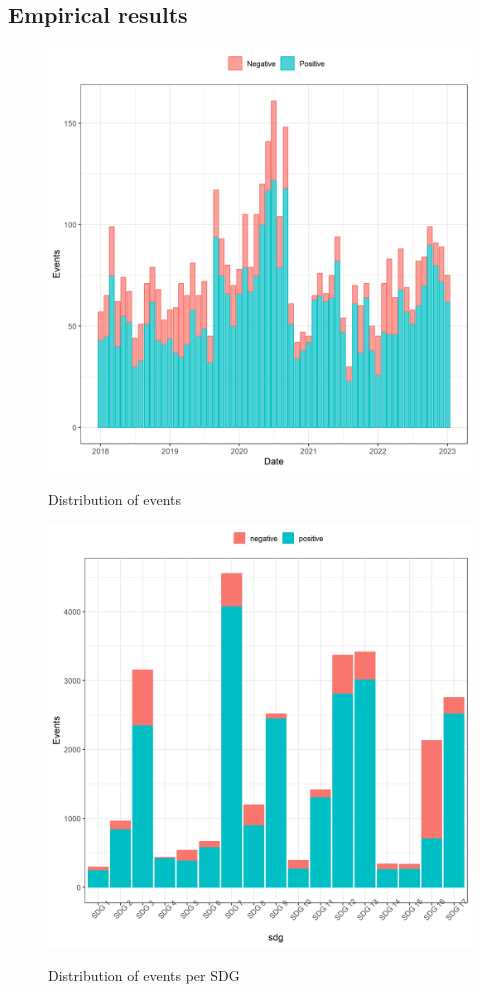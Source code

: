 
\subsection{Empirical results}
\begin{figure} [H]
    \centering
    \caption{Distribution of events}
    \includegraphics[scale=0.6]{Projekt/1.Figures analysis/event_distribution.png}
    \label{fig:event_distribution}
\end{figure}

\begin{figure} [H]
    \centering
    \caption{Distribution of events per SDG}
    \includegraphics[scale=0.6]{Projekt/1.Figures analysis/event_distribution_SDG.png}
    \label{fig:event_distribution_SDG}
\end{figure}

